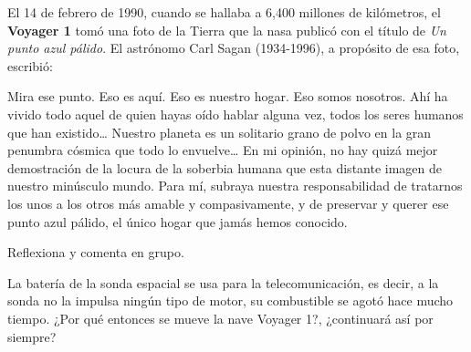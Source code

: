 \documentclass[11pt]{book}
\begin{document}
\begin{boxK}
  El 14 de febrero de 1990, cuando se hallaba a 6,400 millones de kilómetros,
  el \textbf{Voyager 1} tomó una foto de la Tierra que la nasa publicó con el
  t\'itulo de \emph{Un punto azul pálido}. El astrónomo Carl Sagan (1934-1996), a propósito de esa foto, escribió:

  \begin{boxF}
    Mira ese punto. Eso es aquí. Eso es nuestro hogar. Eso somos nosotros.
    Ahí ha vivido todo aquel de quien hayas oído hablar alguna vez,
    todos los seres humanos que han existido\dots
    Nuestro planeta es un solitario grano de polvo en la gran penumbra
    cósmica que todo lo envuelve\dots
    En mi opinión, no hay quizá mejor demostración
    de la locura de la soberbia humana que esta distante imagen de nuestro minúsculo
    mundo. Para mí, subraya nuestra responsabilidad de tratarnos los unos a los
    otros más amable y compasivamente, y de preservar y querer ese punto azul pálido,
    el único hogar que jamás hemos conocido.
  \end{boxF}

  Reflexiona y comenta en grupo.

  La batería de la sonda espacial se usa para la telecomunicación, es decir, a la sonda no la impulsa ningún tipo de motor, su combustible se agotó hace mucho tiempo. ¿Por qué entonces se mueve la nave Voyager 1?, ¿continuará así por siempre?
\end{boxK}
\end{document}

